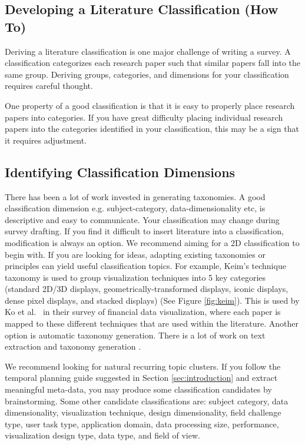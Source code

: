 \subsection{Developing a Literature Classification (How To) } \label{sec:classification}
Deriving a literature classification is one major challenge of writing a survey. A classification categorizes each research paper such that similar papers fall into the same group. Deriving groups, categories, and dimensions for your classification requires careful thought.

One property of a good classification is that it is easy to properly place research papers into categories. If you have great difficulty placing individual research papers into the categories identified in your classification, this may be a sign that it requires adjustment.

\subsection{Identifying Classification Dimensions } \label{sec:identify}
There has been a lot of work invested in generating taxonomies. A good classification dimension e.g. subject-category, data-dimensionality etc, is descriptive and easy to communicate. Your classification may change during survey drafting. If you find it difficult to insert literature into a classification, modification is always an option. We recommend aiming for a 2D classification to begin with.
If you are looking for ideas, adapting existing taxonomies or principles can yield useful classification topics. For example, Keim's technique taxonomy \cite{keim2002information} is used to group visualization techniques into 5 key categories (standard 2D/3D displays, geometrically-transformed displays, iconic displays, dense pixel displays, and stacked displays) (See Figure \ref{fig:keim}). This is used by Ko et al.\ \cite{ko2016survey} in their survey of financial data visualization, where each paper is mapped to these different techniques that are used within the literature. Another option is automatic taxonomy generation. There is a lot of work on text extraction \cite{dias2000combining,park2002automatic} and taxonomy generation \cite{bakar2009building, tsui2010concept, ottens2007multi, velardi2007taxonomy, murthy2010automatically, carrion2018designing}.

We recommend looking for natural recurring topic clusters. If you follow the temporal planning guide suggested in Section \ref{sec:introduction} and extract meaningful meta-data, you may produce some classification candidates by brainstorming. Some other candidate classifications are: subject category, data dimensionality, visualization technique, design dimensionality, field challenge type, user task type, application domain, data processing size, performance, visualization design type, data type, and field of view.

